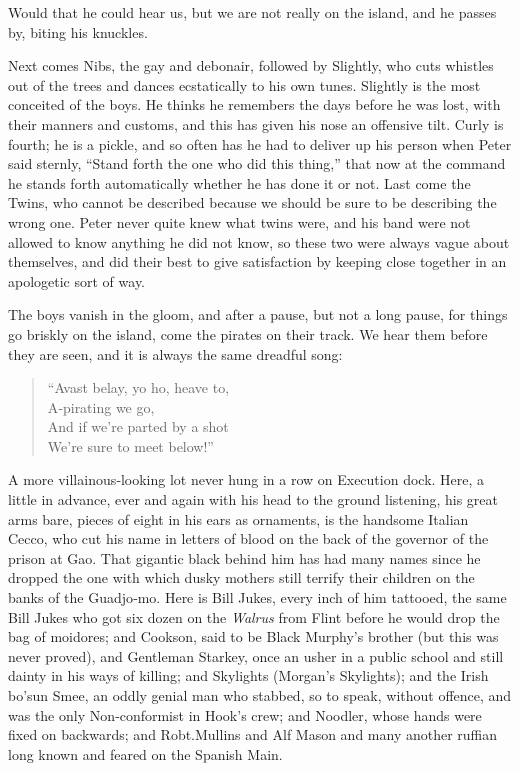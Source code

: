 Would that he could hear us,
but we are not really on the island, and he passes by, biting his knuckles.

Next comes Nibs, the gay and debonair,
followed by Slightly, who cuts whistles out of the trees and dances ecstatically to his own tunes.
Slightly is the most conceited of the boys.
He thinks he remembers the days before he was lost, with their manners and customs,
and this has given his nose an offensive tilt.
Curly is fourth;
he is a pickle,
and so often has he had to deliver up his person when Peter said sternly,
“Stand forth the one who did this thing,”
that now at the command he stands forth automatically whether he has done it or not.
Last come the Twins, who cannot be described because we should be sure to be describing the wrong one.
Peter never quite knew what twins were, and his band were not allowed to know anything he did not know,
so these two were always vague about themselves,
and did their best to give satisfaction by keeping close together in an apologetic sort of way.

The boys vanish in the gloom,
and after a pause, but not a long pause, for things go briskly on the island,
come the pirates on their track.
We hear them before they are seen, and it is always the same dreadful song:

\begin{verse}
	“Avast belay, yo ho, heave to,\\
	A‐pirating we go,\\
	And if we’re parted by a shot\\
	We’re sure to meet below!”
\end{verse}

A more villainous‐looking lot never hung in a row on Execution dock.
Here, a little in advance, ever and again with his head to the ground listening,
his great arms bare, pieces of eight in his ears as ornaments,
is the handsome Italian Cecco,
who cut his name in letters of blood on the back of the governor of the prison at Gao.
That gigantic black behind him has had many names
since he dropped the one with which dusky mothers still terrify their children on the banks of the Guadjo‐mo.
Here is Bill Jukes, every inch of him tattooed,
the same Bill Jukes who got six dozen on the \emph{Walrus} from Flint before he would drop the bag of moidores;
and Cookson, said to be Black Murphy’s brother (but this was never proved),
and Gentleman Starkey, once an usher in a public school and still dainty in his ways of killing;
and Skylights (Morgan’s Skylights);
and the Irish bo’sun Smee,
an oddly genial man who stabbed, so to speak, without offence,
and was the only Non‐conformist in Hook’s crew;
and Noodler, whose hands were fixed on backwards;
and Robt.\@ Mullins and Alf Mason and many another ruffian long known and feared on the Spanish Main.

